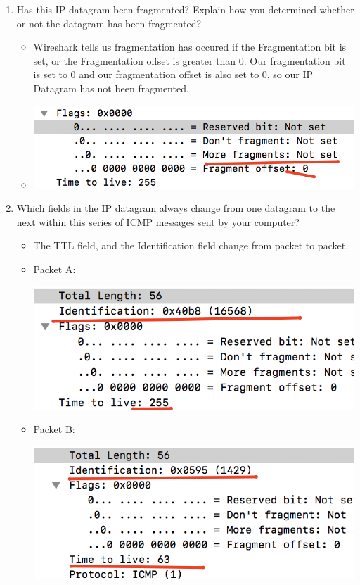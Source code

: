 \documentclass{article}
\begin{document}
\begin{enumerate}
      \item Has this IP datagram been fragmented?  Explain how you determined whether or not the datagram has been fragmented?
          \begin{itemize}
            \item Wireshark tells us fragmentation has occured if the Fragmentation bit is set, or the Fragmentation offset is greater than 0.  Our fragmentation bit is set to 0 and our fragmentation offset is also set to 0, so our IP Datagram has not been fragmented.
            \item \includegraphics[scale=0.5]{images/IP4.png}
          \end{itemize}

      \item Which fields in the IP datagram always change from one datagram to the next within this series of ICMP messages sent by your computer?
          \begin{itemize}
            \item The TTL field, and the Identification field change from packet to packet.
            \item Packet A:\par\includegraphics[scale=0.5]{images/IP5a.png}
            \item Packet B:\par\includegraphics[scale=0.5]{images/IP5b.png}
          \end{itemize}


\end{enumerate}
\end{document}
